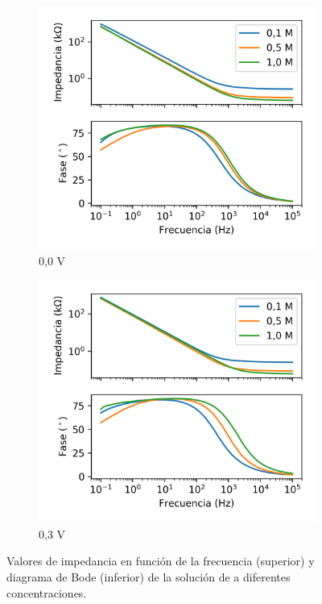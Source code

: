 \documentclass[fleqn,11pt]{SelfArx}
\begin{document}
	\begin{figure}[t]
		\centering
		\begin{subfigure}[t]{0.49\textwidth}
			\centering
			\includegraphics[width = \linewidth]{LiClO4_0,0V}
			\caption{0,0 V}
		\end{subfigure}
		\begin{subfigure}[t]{0.49\textwidth}
			\centering
			\includegraphics[width = \linewidth]{LiClO4_0,3V}
			\caption{0,3 V}
		\end{subfigure}
		\caption{Valores de impedancia en funci\'on de la frecuencia (superior) y diagrama de Bode (inferior) de la soluci\'on de  a diferentes concentraciones.}
		\label{fig: concentraciones}
	\end{figure}
	
\end{document}
